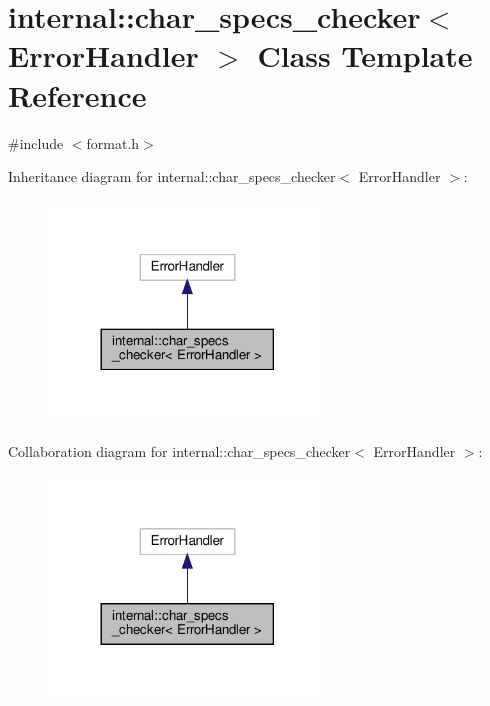 \hypertarget{classinternal_1_1char__specs__checker}{}\section{internal\+:\+:char\+\_\+specs\+\_\+checker$<$ Error\+Handler $>$ Class Template Reference}
\label{classinternal_1_1char__specs__checker}


{\ttfamily \#include $<$format.\+h$>$}



Inheritance diagram for internal\+:\+:char\+\_\+specs\+\_\+checker$<$ Error\+Handler $>$\+:
\nopagebreak
\begin{figure}[H]
\begin{center}
\leavevmode
\includegraphics[width=209pt]{classinternal_1_1char__specs__checker__inherit__graph}
\end{center}
\end{figure}


Collaboration diagram for internal\+:\+:char\+\_\+specs\+\_\+checker$<$ Error\+Handler $>$\+:
\nopagebreak
\begin{figure}[H]
\begin{center}
\leavevmode
\includegraphics[width=209pt]{classinternal_1_1char__specs__checker__coll__graph}
\end{center}
\end{figure}

